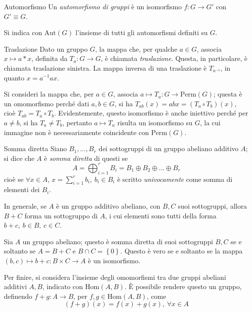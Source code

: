 \documentclass[11pt, a4paper]{scrartcl}
\theoremstyle{definition}
\numberwithin{esempio}{section}
\theoremstyle{definition}
\numberwithin{obs}{section}
\numberwithin{nota}{section}
\numberwithin{equation}{subsection}
\begin{document}
\begin{definizione}
	{Automorfismo}{}
	Un \textit{automorfismo di gruppi} \`e un isomorfismo $f:G \to G'$ con $G' \equiv G$.
\end{definizione}
\noindent Si indica con $\mathrm{Aut} (G)$ l'insieme di tutti gli automorfismi definiti su $G$. 
\begin{definizione}
	{Traslazione}{}
	Dato un gruppo $G$, la mappa che, per qualche $a \in G$, associa $x \mapsto a*x$, definita da $T_a :G \to G$, \`e chiamata \textit{traslazione}. Questa, in particolare, \`e chiamata traslazione sinistra.
La mappa inversa di una traslazione \`e $T_{a^{-1} } $, in quanto $x = a^{-1} a x$. 
\end{definizione}
\noindent Si consideri la mappa che, per $a \in G$, associa $a \mapsto T_a : G \to \mathrm{Perm} (G)$; questa \`e un omomorfismo perch\'e dati $a, b \in G$, si ha $T_{ab} (x) = abx =( T_a \circ T_b) (x) $, cio\`e $T_{ab} = T_a \circ T_b $.
Evidentemente, questo isomorfismo \`e anche iniettivo perch\'e per $a\neq b$, si ha $T_a \neq T_b$, pertanto $a\mapsto T_a$ risulta un isomorfismo su $G$, la cui immagine non \`e necessariamente coincidente con $\mathrm{Perm} (G)$.
\begin{definizione}
	{Somma diretta}{}
	Siano $B_1,\ldots,B_r$ dei sottogruppi di un gruppo abeliano additivo $A$; si dice che $A$ \`e \textit{somma diretta} di questi se 
	\[
	A = \bigoplus _{i=1} ^r B_i = B_1\oplus B_2 \oplus \ldots\oplus B_r
	\] 
	cio\`e se $\forall x \in A$, $x = \sum_{i=1}^{r} b_i, \ b_i \in B_i$ \`e scritto \textit{univocamente} come somma di elementi dei $B_i$.
\end{definizione}
\noindent In generale, se $A$ \`e un gruppo additivo abeliano, con $B,  C $ suoi sottogruppi, allora $B+C$ forma un sottogruppo di $A$, i cui elementi sono tutti della forma $b + c, \ b\in B , \ c \in C$.
\begin{teorema}
	{}{}
	Sia $A$ un gruppo abeliano; questo \`e somma diretta di suoi sottogruppi $B, C$ se e soltanto se $A = B+C$ e $B\cap C = \left\{ 0 \right\} $. 
	Questo \`e vero se e soltanto se la mappa $(b,c)\mapsto b+c : B \times C \to A$ \`e un isomorfismo.
\end{teorema}
 Per finire, si considera l'insieme degli omomorfismi tra due gruppi abeliani additivi $A ,B$, indicato con $\mathrm{Hom } (A,B)$. \`E possibile rendere questo un gruppo, definendo $f+g : A \to B$, per $f,g \in \mathrm{Hom} (A,B)$, come
 \[
	 (f+g) (x) = f(x) + g(x), \ \forall x \in A
 \] 
\end{document}
